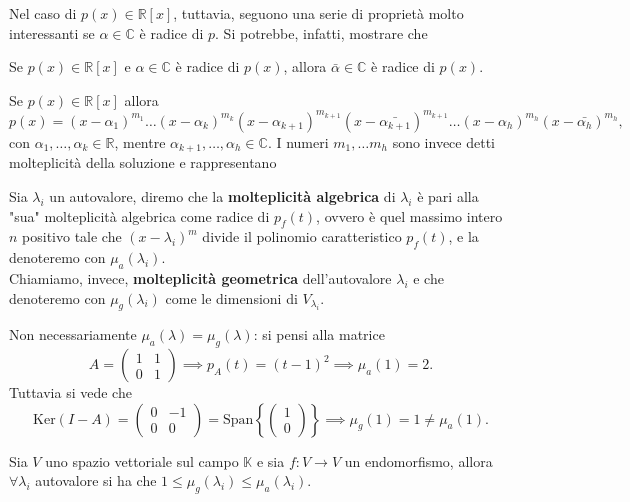 Nel caso di $p(x) \in \mathbb{R}[x]$, tuttavia, seguono una serie di proprietà molto interessanti se $\alpha \in \mathbb{C}$ è radice di $p$. Si potrebbe, infatti, mostrare che
\begin{prop}
    Se $p(x) \in \mathbb{R}[x]$ e $\alpha \in \mathbb{C}$ è radice di $p(x)$, allora $\bar{\alpha} \in \mathbb{C}$ è radice di $p(x)$.
\end{prop}
\begin{cor}
    Se $p(x) \in \mathbb{R}[x]$ allora
    $$
        p(x) = (x-\alpha_1)^{m_1} \ldots (x-\alpha_k)^{m_k} (x - \alpha_{k+1})^{m_{k+1}} (x - \bar{\alpha_{k+1}})^{m_{k+1}} \ldots (x - \alpha_h)^{m_h} (x - \bar{\alpha_h})^{m_h}, 
    $$ 
    con $\alpha_1, \ldots, \alpha_k \in \mathbb{R}$, mentre $\alpha_{k+1}, \ldots, \alpha_h \in \mathbb{C}$. I numeri $m_1, \ldots m_h$ sono invece detti molteplicità della soluzione e rappresentano 
\end{cor}
\begin{definition}
    Sia $\lambda_i$ un autovalore, diremo che la \textbf{molteplicità algebrica} di $\lambda_i$ è pari alla "sua" molteplicità algebrica come radice di $p_f(t)$, ovvero è quel massimo intero $n$ positivo tale che $(x - \lambda_i)^m$ divide il polinomio caratteristico $p_f(t)$, e la denoteremo con $\mu_a(\lambda_i)$. \\
    Chiamiamo, invece, \textbf{molteplicità geometrica} dell'autovalore $\lambda_i$ e che denoteremo con $\mu_g(\lambda_i)$ come le dimensioni di $V_{\lambda_i}$.
\end{definition}
\begin{remark}
    Non necessariamente $\mu_a(\lambda) = \mu_g(\lambda)$: si pensi alla matrice
    $$
        A = \begin{pmatrix}
            1 & 1 \\
            0 & 1
        \end{pmatrix} \implies p_A(t) = (t-1)^2 \implies \mu_a(1) = 2.
    $$
    Tuttavia si vede che
    $$
        \text{Ker}(I-A) = \begin{pmatrix}
            0 & -1 \\
            0 & 0
        \end{pmatrix} = \text{Span}\left\{ \begin{pmatrix} 1 \\ 0 \end{pmatrix} \right\} \implies \mu_g(1) = 1 \neq \mu_a(1).
    $$
\end{remark}
\begin{theorem}
    Sia $V$ uno spazio vettoriale sul campo $\mathbb{K}$ e sia $f: V \to V$ un endomorfismo, allora $\forall \lambda_i$ autovalore si ha che $1 \leq \mu_g(\lambda_i) \leq \mu_a(\lambda_i).$
\end{theorem}
